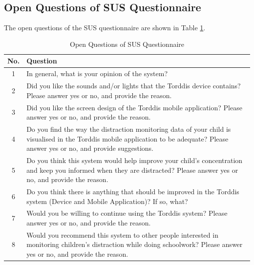 \documentclass[a4paper,fleqn]{cas-sc}
\begin{document}
	\subsection[\appendixname~\thesection]{Open Questions of SUS Questionnaire}
	\label{Appendix:OpenQuestions}
	The open questions of the SUS questionnaire are shown in Table \ref{tab:OpenQuestion}.
	\begin{table}[bt!]
		\centering
		\caption{Open Questions of SUS Questionnaire \label{tab:OpenQuestion}}
		\begin{tabularx}{\textwidth}{c X }
			\toprule
			\textbf{No.} & \textbf{Question} \\
			\midrule
			1 & In general, what is your opinion of the system? \\
			2 & Did you like the sounds and/or lights that the Torddis device contains? Please answer yes or no, and provide the reason. \\
			3 & Did you like the screen design of the Torddis mobile application? Please answer yes or no, and provide the reason. \\
			4 & Do you find the way the distraction monitoring data of your child is visualised in the Torddis mobile application to be adequate? Please answer yes or no, and provide suggestions. \\
			5 & Do you think this system would help improve your child's concentration and keep you informed when they are distracted? Please answer yes or no, and provide the reason. \\
			6 & Do you think there is anything that should be improved in the Torddis system (Device and Mobile Application)? If so, what? \\
			7 & Would you be willing to continue using the Torddis system? Please answer yes or no, and provide the reason. \\
			8 & Would you recommend this system to other people interested in monitoring children's distraction while doing schoolwork? Please answer yes or no, and provide the reason. \\ \bottomrule
		\end{tabularx}
	\end{table}
\end{document}

